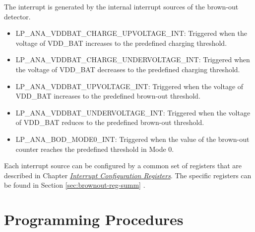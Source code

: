 \documentclass[main\_\_EN.tex]{subfiles}
\begin{document}
The interrupt is generated by the internal interrupt sources of the brown-out detector.

\begin{itemize}
\item \label{int:LPANAVDDBATCHARGEUPVOLTAGEINT}LP\_ANA\_VDDBAT\_CHARGE\_UPVOLTAGE\_INT: Triggered when the voltage of VDD\_BAT increases to the predefined charging threshold.
\item \label{int:LPANAVDDBATCHARGEUNDERVOLTAGEINT}LP\_ANA\_VDDBAT\_CHARGE\_UNDERVOLTAGE\_INT: Triggered when the voltage of VDD\_BAT decreases to the predefined charging threshold.
\item \label{int:LPANAVDDBATUPVOLTAGEINTRAW}LP\_ANA\_VDDBAT\_UPVOLTAGE\_INT: Triggered when the voltage of VDD\_BAT increases to the predefined brown-out threshold.
\item \label{int:LPANAVDDBATUNDERVOLTAGEINT}LP\_ANA\_VDDBAT\_UNDERVOLTAGE\_INT: Triggered when the voltage of VDD\_BAT reduces to the predefined brown-out threshold.
\item \label{int:LPANABODMODE0INT}LP\_ANA\_BOD\_MODE0\_INT: Triggered when the value of the brown-out counter reaches the predefined threshold in Mode 0.
\end{itemize}

Each interrupt source can be configured by a common set of registers that are described in Chapter \hyperref[interrupt-config-registers]{\textit{Interrupt Configuration Registers}}. The specific registers can be found in Section \ref{sec:brownout-reg-summ} \textit{}.


\section{Programming Procedures}
\end{document}
